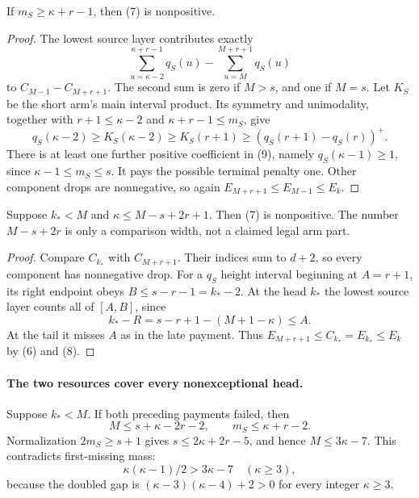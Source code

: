 \begin{lemma}
If $m_S\ge\kappa+r-1$, then (7) is nonpositive.
\end{lemma}
\begin{proof}
The lowest source layer contributes exactly
\[
 \sum_{u=\kappa-2}^{\kappa+r-1}q_S(u)
                  -\sum_{u=M}^{M+r+1}q_S(u)             \tag{9}
\]
to $C_{M-1}-C_{M+r+1}$. The second sum is zero if $M>s$, and one if
$M=s$. Let $K_S$ be the short arm's main interval product. Its symmetry
and unimodality, together with $r+1\le\kappa-2$ and
$\kappa+r-1\le m_S$, give
\[
 q_S(\kappa-2)\ge K_S(\kappa-2)\ge K_S(r+1)
                         \ge(q_S(r+1)-q_S(r))^+.
\]
There is at least one further positive coefficient in (9), namely
$q_S(\kappa-1)\ge1$, since $\kappa-1\le m_S\le s$.
It pays the possible terminal penalty one. Other component drops are
nonnegative, so again $E_{M+r+1}\le E_{M-1}\le E_k$.
\end{proof}

\begin{lemma}
Suppose $k_*<M$ and $\kappa\le M-s+2r+1$. Then (7) is nonpositive.
The number $M-s+2r$ is only a comparison width, not a claimed legal arm part.
\end{lemma}
\begin{proof}
Compare $C_{k_*}$ with $C_{M+r+1}$. Their indices sum to $d+2$,
so every component has nonnegative drop. For a $q_S$ height interval
beginning at $A=r+1$, its right endpoint obeys
$B\le s-r-1=k_*-2$. At the head $k_*$ the lowest source layer counts
all of $[A,B]$, since
\[
                   k_*-R=s-r+1-(M+1-\kappa)\le A.
\]
At the tail it misses $A$ as in the late payment.
Thus $E_{M+r+1}\le C_{k_*}=E_{k_*}\le E_k$ by (6) and (8).
\end{proof}

\paragraph{The two resources cover every nonexceptional head.}
Suppose $k_*<M$. If both preceding payments failed, then
\[
 M\le s+\kappa-2r-2,\qquad m_S\le\kappa+r-2.
\]
Normalization $2m_S\ge s+1$ gives $s\le2\kappa+2r-5$, and hence
$M\le3\kappa-7$. This contradicts first-missing mass:
\[
 \kappa(\kappa-1)/2>3\kappa-7
       \quad(\kappa\ge3),
\]
because the doubled gap is
$(\kappa-3)(\kappa-4)+2>0$ for every integer $\kappa\ge3$.


